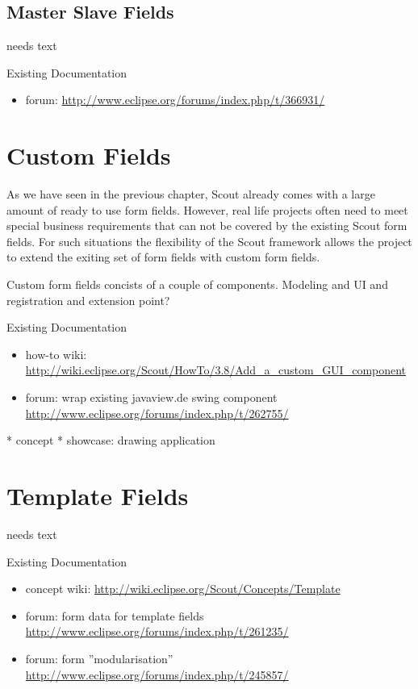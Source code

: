 \documentclass[a4paper,10pt,twoside]{book}
\begin{document}
\section{Master Slave Fields}
needs text

\noindent Existing Documentation
\begin{itemize}
  \item forum: \url{http://www.eclipse.org/forums/index.php/t/366931/}
\end{itemize}

\chapter{Custom Fields}

As we have seen in the previous chapter, Scout already comes with a large amount of ready to use form fields. 
However, real life projects often need to meet special business requirements that can not be covered by the existing Scout form fields. 
For such situations the flexibility of the Scout framework allows the project to extend the exiting set of form fields with custom form fields. 

Custom form fields concists of a couple of components. Modeling and UI and registration and extension point?

\noindent Existing Documentation
\begin{itemize}
  \item how-to wiki: \url{http://wiki.eclipse.org/Scout/HowTo/3.8/Add_a_custom_GUI_component}
  \item forum: wrap existing javaview.de swing component \url{http://www.eclipse.org/forums/index.php/t/262755/}
\end{itemize}

  * concept
  * showcase: drawing application

\chapter{Template Fields}
needs text

\noindent Existing Documentation
\begin{itemize}
  \item concept wiki: \url{http://wiki.eclipse.org/Scout/Concepts/Template}
  \item forum: form data for template fields \url{http://www.eclipse.org/forums/index.php/t/261235/}
  \item forum: form ''modularisation'' \url{http://www.eclipse.org/forums/index.php/t/245857/}
\end{itemize}
\end{document}
